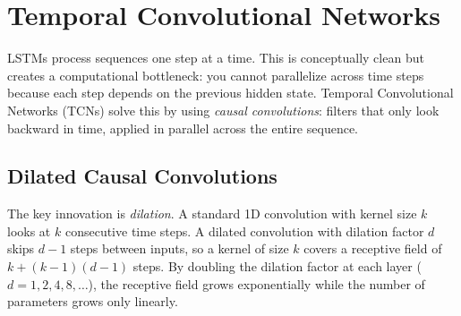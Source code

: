 \section{Temporal Convolutional Networks}\label{sec:dl:tcn}

LSTMs process sequences one step at a time. This is conceptually clean but creates a computational bottleneck: you cannot parallelize across time steps because each step depends on the previous hidden state.
Temporal Convolutional Networks (TCNs) solve this by using \emph{causal convolutions}: filters that only look backward in time, applied in parallel across the entire sequence.

\subsection{Dilated Causal Convolutions}

The key innovation is \emph{dilation}.
A standard 1D convolution with kernel size $k$ looks at $k$ consecutive time steps.
A dilated convolution with dilation factor $d$ skips $d-1$ steps between inputs, so a kernel of size $k$ covers a receptive field of $k + (k-1)(d-1)$ steps.
By doubling the dilation factor at each layer ($d = 1, 2, 4, 8, \ldots$), the receptive field grows exponentially while the number of parameters grows only linearly.

